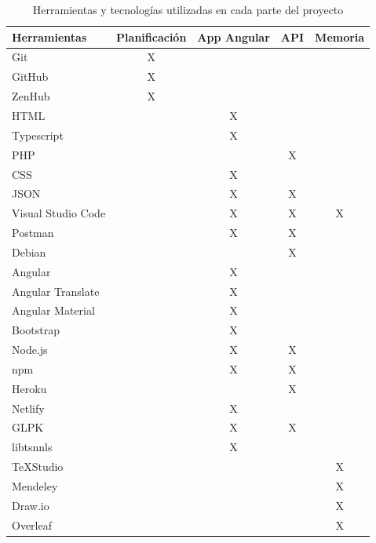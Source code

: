 \begin{table}[h]
    \centering
    \begin{tabular}{l c c c c}
        \textbf{Herramientas} & Planificación & App Angular & API & Memoria \\ 
        \hline
        Git & X & & &\\
        GitHub & X & & & \\
        ZenHub & X & & &\\
        HTML & & X & &\\
        Typescript & & X & &\\
        PHP & & & X &\\
        CSS & & X & &\\
        JSON & & X & X &\\
        Visual Studio Code & & X & X & X\\
        Postman & & X & X &\\
        Debian & &  & X &\\
        Angular & & X & &\\
        Angular Translate & & X & &\\
        Angular Material & & X & &\\
        Bootstrap & & X & &\\
        Node.js & & X & X &\\
        npm & & X & X & \\
        Heroku & & & X &\\
        Netlify & & X & &\\
        GLPK & & X & X & \\
        libtsnnls & & X & &\\
        \TeX{}Studio & & & & X\\
        Mendeley & & & & X\\
        Draw.io & & & & X\\
        Overleaf & & & & X\\
    \end{tabular}
    \caption{Herramientas y tecnologías utilizadas en cada parte del proyecto}
    \label{fig:herramientasportipodeuso}
\end{table}













